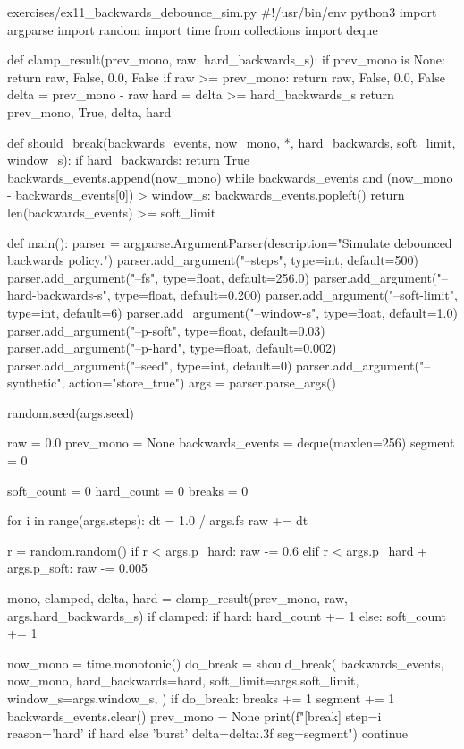 \documentclass[11pt,openany]{book}
\begin{document}
\begin{filecontents*}{exercises/ex11_backwards_debounce_sim.py}
#!/usr/bin/env python3
import argparse
import random
import time
from collections import deque


def clamp_result(prev_mono, raw, hard_backwards_s):
    if prev_mono is None:
        return raw, False, 0.0, False
    if raw >= prev_mono:
        return raw, False, 0.0, False
    delta = prev_mono - raw
    hard = delta >= hard_backwards_s
    return prev_mono, True, delta, hard


def should_break(backwards_events, now_mono, *, hard_backwards, soft_limit, window_s):
    if hard_backwards:
        return True
    backwards_events.append(now_mono)
    while backwards_events and (now_mono - backwards_events[0]) > window_s:
        backwards_events.popleft()
    return len(backwards_events) >= soft_limit


def main():
    parser = argparse.ArgumentParser(description="Simulate debounced backwards policy.")
    parser.add_argument("--steps", type=int, default=500)
    parser.add_argument("--fs", type=float, default=256.0)
    parser.add_argument("--hard-backwards-s", type=float, default=0.200)
    parser.add_argument("--soft-limit", type=int, default=6)
    parser.add_argument("--window-s", type=float, default=1.0)
    parser.add_argument("--p-soft", type=float, default=0.03)
    parser.add_argument("--p-hard", type=float, default=0.002)
    parser.add_argument("--seed", type=int, default=0)
    parser.add_argument("--synthetic", action="store_true")
    args = parser.parse_args()

    random.seed(args.seed)

    raw = 0.0
    prev_mono = None
    backwards_events = deque(maxlen=256)
    segment = 0

    soft_count = 0
    hard_count = 0
    breaks = 0

    for i in range(args.steps):
        dt = 1.0 / args.fs
        raw += dt

        r = random.random()
        if r < args.p_hard:
            raw -= 0.6
        elif r < args.p_hard + args.p_soft:
            raw -= 0.005

        mono, clamped, delta, hard = clamp_result(prev_mono, raw, args.hard_backwards_s)
        if clamped:
            if hard:
                hard_count += 1
            else:
                soft_count += 1

        now_mono = time.monotonic()
        do_break = should_break(
            backwards_events,
            now_mono,
            hard_backwards=hard,
            soft_limit=args.soft_limit,
            window_s=args.window_s,
        )
        if do_break:
            breaks += 1
            segment += 1
            backwards_events.clear()
            prev_mono = None
            print(f"[break] step={i} reason={'hard' if hard else 'burst'} delta={delta:.3f} seg={segment}")
            continue


\end{filecontents*}
\end{document}
